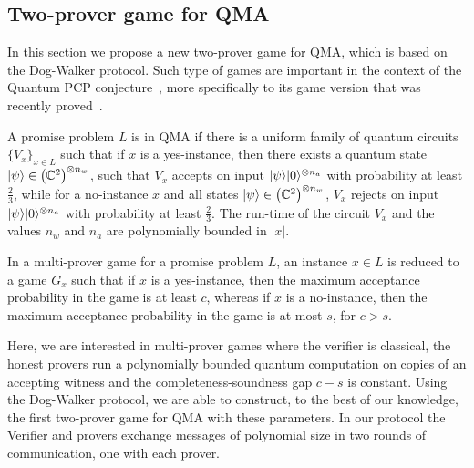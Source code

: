 \subsection{Two-prover game for QMA}\label{sec:qma}

In this section we propose a new two-prover game for QMA, which is based on the Dog-Walker
protocol. Such type of games are important in the context of the Quantum PCP conjecture~\cite{AharonovAV13}, more specifically to its game version that was recently proved~\cite{NatarajanV18}.


A promise problem $L$ is in QMA if there is a uniform family
of quantum circuits $\{V_x\}_{x \in L}$ such that if $x$ is a yes-instance, then there exists a
quantum state $|\psi\rangle \in \left(\mathbb{C}^2\right)^{\otimes n_w}$, such that
$V_x$  accepts on input $|\psi\rangle|0\rangle^{\otimes n_a}$ with probability at least
$\frac{2}{3}$, while for a no-instance $x$ and  all states $|\psi\rangle \in
\left(\mathbb{C}^2\right)^{\otimes n_w}$, $V_x$
rejects on input $|\psi\rangle|0\rangle^{\otimes n_a}$ with probability at
least $\frac{2}{3}$. The run-time of the circuit $V_x$ and the values $n_w$ and $n_a$ are polynomially bounded in $|x|$.

 In a multi-prover game for a promise problem $L$, an
 instance $x \in L$ is reduced to a game $G_x$ such that if $x$ is a yes-instance, then the maximum
 acceptance probability in the game is at least $c$, whereas if $x$ is a
 no-instance,
 then the maximum acceptance probability in the game is  at most $s$, for $c
 > s$.

 Here, we are interested in multi-prover games where the verifier is classical,
 the honest provers run a polynomially bounded quantum computation on copies
 of an accepting witness and the completeness-soundness gap $c-s$ is constant.
Using the Dog-Walker protocol, we are able to construct, to the best of our knowledge, the first two-prover
game for QMA with these parameters. In our protocol the Verifier and provers exchange messages of polynomial size 
in two rounds of communication, one with each
prover.

